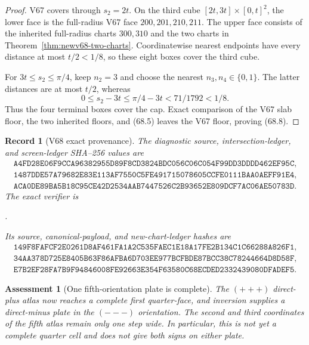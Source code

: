 \documentclass[11pt,oneside]{article}
\newtheorem{assessment}[theorem]{Assessment}
\newtheorem{record}[theorem]{Record}
\theoremstyle{definition}
\theoremstyle{remark}
\begin{document}
\begin{proof}
V67 covers through \(s_2=2t\).  On the third cube
\([2t,3t]\times[0,t]^2\), the lower face is the full-radius V67
face \(200,201,210,211\).  The upper face consists of the inherited
full-radius charts \(300,310\) and the two charts in
Theorem~\ref{thm:newv68-two-charts}.  Coordinatewise nearest
endpoints have every distance at most \(t/2<1/8\), so these eight
boxes cover the third cube.

For \(3t\le s_2\le\pi/4\), keep \(n_2=3\) and choose the nearest
\(n_3,n_4\in\{0,1\}\).  The latter distances are at most \(t/2\),
whereas
\[
 0\le s_2-3t\le\pi/4-3t<71/1792<1/8.                 \tag{68.9}
\]
Thus the four terminal boxes cover the cap.  Exact comparison of
the V67 slab floor, the two inherited floors, and (68.5) leaves the
V67 floor, proving (68.8).
\end{proof}

\begin{record}[V68 exact provenance]
\label{rec:newv68-provenance}
The diagnostic source, intersection-ledger, and screen-ledger
SHA--256 values are
\[
\begin{gathered}
\texttt{A4FD28E06F9CCA96382955D89F8CD3824BDC056C06C054F99DD3DDDD462EF95C},\\
\texttt{1487DDE57A79682E83E113AF7550C5FE491715078605CCFE0111BAA0AEFF91E4},\\
\texttt{ACA0DE89BA5B18C95CE42D2534AAB7447526C2B93652E809DCF7AC06AE50783D}.
\end{gathered}                                        \tag{68.10}
\]
The exact verifier is
\begin{center}
\footnotesize
{}.
\end{center}
Its source, canonical-payload, and new-chart-ledger hashes are
\[
\begin{gathered}
\texttt{149F8FAFCF2E0261D8AF461FA1A2C535FAEC1E18A17FE2B134C1C66288A826F1},\\
\texttt{34AA378D725E8405B63F86AFBA6D703EE977BCFBDE87BCC38C78244664D8D58F},\\
\texttt{E7B2EF28FA7B9F94846008FE92663E354F63580C68ECDED2332439080DFADEF5}.
\end{gathered}                                        \tag{68.11}
\]
\end{record}

\begin{assessment}[One fifth-orientation plate is complete]
\label{ass:newv68}
The \((+++)\) direct-plus atlas now reaches a complete first
quarter-face, and inversion supplies a direct-minus plate in the
\((---)\) orientation.  The second and third coordinates of the
fifth atlas remain only one step wide.  In particular, this is not
yet a complete quarter cell and does not give both signs on either
plate.
\end{assessment}
\end{document}

